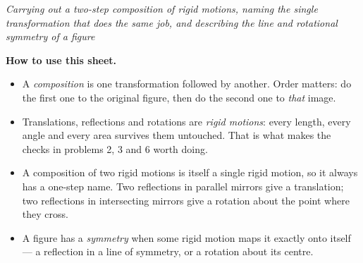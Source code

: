 \documentclass[12pt]{article}
\begin{document}
\newlength{\figcol}\setlength{\figcol}{0.47\linewidth}
\newlength{\qcol}\setlength{\qcol}{0.49\linewidth}

\begin{center}\small\textit{Carrying out a two-step composition of rigid motions, naming the
single transformation that does the same job, and describing the line and rotational symmetry
of a figure}\end{center}

\noindent\small\textbf{How to use this sheet.}
\begin{itemize}[label={$\bullet$}, leftmargin=1.1cm, itemsep=1pt, topsep=2pt]
  \item A \emph{composition} is one transformation followed by another. Order matters: do the
        first one to the original figure, then do the second one to \emph{that} image.
  \item Translations, reflections and rotations are \emph{rigid motions}: every length, every
        angle and every area survives them untouched. That is what makes the checks in
        problems 2, 3 and 6 worth doing.
  \item A composition of two rigid motions is itself a single rigid motion, so it always has a
        one-step name. Two reflections in parallel mirrors give a translation; two reflections
        in intersecting mirrors give a rotation about the point where they cross.
  \item A figure has a \emph{symmetry} when some rigid motion maps it exactly onto itself ---
        a reflection in a line of symmetry, or a rotation about its centre.
\end{itemize}
\normalsize

\bigskip
\end{document}
